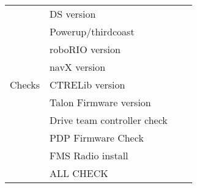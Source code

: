 \documentclass[12pt]{extarticle}
\begin{document}
\begin{tabular}{l|l|l|l}
\multirow{9}{*}{Checks}     &  DS version &\\ \cline{2-3}
&  Powerup/thirdcoast &\\ \cline{2-3}
& roboRIO version & \\ \cline{2-3}
& navX version & \\ \cline{2-3}
& CTRELib version & \\ \cline{2-3}
& Talon Firmware version & \\ \cline{2-3}
& Drive team controller check & \\ \cline{2-3}
﻿& PDP Firmware Check & \\ \cline{2-3}
& FMS Radio install & \\ \hline \hline \hline

& ALL CHECK     &  \\ \cline{2-3}

\end{tabular}
\end{document}
